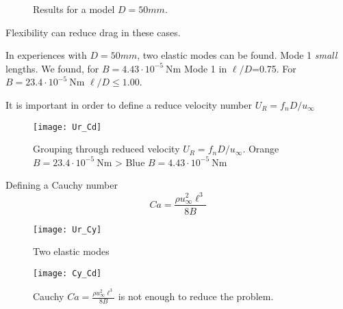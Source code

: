 \documentclass[10pt,fleqn,a4paper,twoside]{article}
\begin{document}
%	
	\begin{figure}		
	\begin{subfigure}[t]{.5\textwidth}
		\centering{} 	\label{fig:B043}
	\end{subfigure}
	\begin{subfigure}[t]{.5\textwidth}
	\centering{} \label{fig:B234}
\end{subfigure}	


\caption{Results for a model $D = 50mm$.}

\end{figure}
Flexibility can reduce drag in these cases.

In experiences with $D=50mm$, two elastic modes can be found. Mode 1 \textit{small} lengths. 
We found, for $B=4.43\cdot10^{-5}\SI{}{\newton\meter}$ Mode 1 in $\ell/D$=0.75. For $B=23.4\cdot10^{-5}\SI{}{\newton\meter}$
 $\ell/D\le 1.00$. 
 
 It is important in order to define a reduce velocity number $U_R = f_n D / u_\infty$
  \begin{figure}
 	\texttt{[image: Ur\_Cd]}
 	\caption{Grouping through reduced velocity $U_R = f_n D / u_\infty$. Orange $B=23.4\cdot10^{-5}\SI{}{\newton\meter}$ > Blue $B=4.43\cdot10^{-5}\SI{}{\newton\meter}$ }
 \end{figure}
 Defining a Cauchy number
 $$Ca = \frac{\rho u_\infty^2\ell^3}{8B}$$
 
 \begin{figure}
 	\texttt{[image: Ur\_Cy]}
 	\caption{Two elastic modes }
 \end{figure}
 
  \begin{figure}
 	\texttt{[image: Cy\_Cd]}
 	\caption{Cauchy $\displaystyle Ca = \frac{\rho u_\infty^2\ell^3}{8B}$ is not enough to reduce the problem. }
 \end{figure}
 
\end{document}
